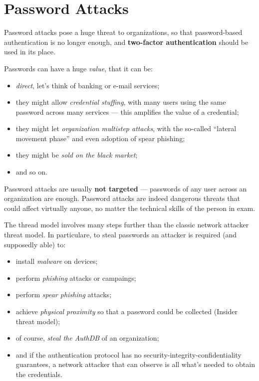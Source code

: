 \documentclass[10pt]{\classname}
\begin{document}
\section{Password Attacks}

Password attacks pose a huge threat to organizations, so that password\--based
authentication is no longer enough, and \textbf{two\--factor authentication}
should be used in its place.

Passwords can have a huge \emph{value}, that it can be:
\begin{itemize}
    \item \emph{direct}, let's think of banking or e\--mail services;
    \item they might allow \emph{credential stuffing}, with many users using
        the same password across many services --- this amplifies the value of a
        credential;
    \item they might let \emph{organization multistep attacks}, with the
        so\--called ``lateral movement phase'' and even adoption of spear phishing;
    \item they might be \emph{sold on the black market};
    \item and so on.
\end{itemize}

Password attacks are usually \textbf{not targeted} --- passwords of any
user across an organization are enough. Password attacks are indeed dangerous
threats that could affect virtually anyone, no matter the technical skills
of the person in exam.

The thread model involves many steps further than the classic network attacker
threat model. In particulare, to steal passwords an attacker is required (and
supposedly able) to:
\begin{itemize}
    \item install \emph{malware} on devices;
    \item perform \emph{phishing} attacks or campaings;
    \item perform \emph{spear phishing} attacks;
    \item achieve \emph{physical proximity} so that a password could be
        collected (Insider threat model);
    \item of course, \emph{steal the AuthDB} of an organization;
    \item and if the authentication protocol has no
        security\--integrity\--confidentiality guarantees, a network attacker
        that can observe is all what's needed to obtain the credentials.
\end{itemize}
\end{document}

